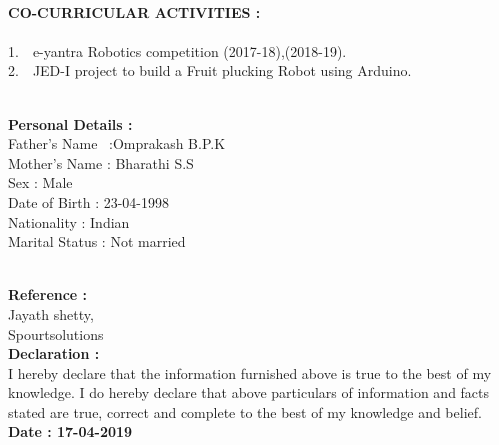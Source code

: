 \documentclass[1pt]{article}
\begin{document}
\begin{flushleft}
\begin{flushleft}
			
			\hspace{1cm}\\ \hspace{1cm}
			
			
			{\small \textbf{CO-CURRICULAR ACTIVITIES :}}\\ \ \\
			1.\ \ e-yantra Robotics competition (2017-18),(2018-19).\\	
			2.\ \ JED-I project to build a Fruit plucking Robot using Arduino.\\
			
			
			\hspace{1cm}\\ \hspace{1cm}
			
			
			{\small \textbf{ Personal Details :}}\\
			\hspace{1cm}Father's Name \ :Omprakash B.P.K\\	
			\hspace{1cm}Mother's Name : Bharathi S.S\\
			\hspace{1cm}Sex : Male\\	
			\hspace{1cm}Date of Birth : 23-04-1998\\
			\hspace{1cm}Nationality : Indian\\
			\hspace{1cm}Marital Status : Not married\\
			
			\hspace{1cm}\\ \hspace{1cm}
			
			{\small \textbf{Reference :}}\\
			\hspace{1cm} Jayath shetty,\\	
			\hspace{1cm} Spourtsolutions\\
			  
			{\small \textbf{Declaration : }}\\
			\hspace{1cm}I hereby declare that the information furnished above is true to the best of my knowledge. I do hereby declare that above particulars of information and facts stated are true, correct and complete to the best of my knowledge and belief.\\ 
			{\small \textbf{Date : 17-04-2019 }}\\
			
		\end{flushleft}
	
	\end{flushleft}
	
\end{document}
